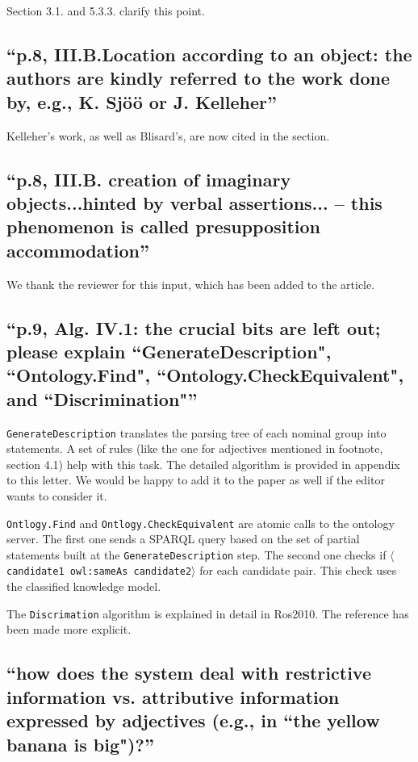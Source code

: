 \documentclass[11pt]{article}
\begin{document}
Section 3.1. and 5.3.3. clarify this point. 

\subsection{``p.8, III.B.Location according to an object: the authors are
kindly referred to the work done by, e.g., K. Sj\"o\"o or J. Kelleher''}

Kelleher's work, as well as Blisard's, are now cited in the section.

\subsection{``p.8, III.B. creation of imaginary objects...hinted by verbal
assertions... -- this phenomenon is called presupposition accommodation''}

We thank the reviewer for this input, which has been added to the article.

\subsection{``p.9, Alg. IV.1: the crucial bits are left out; please explain
``GenerateDescription", ``Ontology.Find", ``Ontology.CheckEquivalent", and
``Discrimination"''}

{\tt GenerateDescription} translates the parsing tree of each nominal group
into statements. A set of rules (like the one for adjectives mentioned 
in footnote, section 4.1) help with this task. The detailed algorithm is provided in appendix to this letter.  We would be happy to add it to the paper as well if the editor wants to consider it.

{\tt Ontlogy.Find} and {\tt Ontlogy.CheckEquivalent} are atomic calls to
the ontology server. The first one sends a SPARQL query based on the set of 
partial statements built at the {\tt GenerateDescription} step. The second
one checks if {\tt $\langle$candidate1 owl:sameAs candidate2$\rangle$} for each candidate pair.
This check uses the classified knowledge model.

The {\tt Discrimation} algorithm is explained in detail in Ros2010. The
reference has been made more explicit.

\subsection{``how does the system deal with restrictive information vs.
attributive information expressed by adjectives (e.g., in ``the yellow banana is
big")?''}
\end{document}
